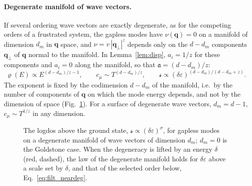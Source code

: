 \documentclass[10pt,a4paper]{article}
\theoremstyle{plain}
\theoremstyle{remark}
\newcommand{\lndos}{{logdos}}  %
\newcommand{\lds}{\mathscr{s}}  %
\begin{document}
\paragraph{Degenerate manifold of wave vectors.} If several ordering wave
vectors are exactly degenerate, as for the competing orders of a frustrated
system, the gapless modes have $\nu(\mathbf q)=0$ on a manifold of dimension
$d_m$ in $\mathbf q$ space, and $\nu=v\,|\mathbf q_\perp|^{z}$ depends only on
the $d-d_m$ components $\mathbf q_\perp$ of $\mathbf q$ normal to the
manifold. In Lemma~\ref{lem:disp}, $a_i=1/z$ for these components and
$a_i=0$ along the manifold, so that $\mathfrak a=(d-d_m)/z$:
\begin{equation}\label{eq:filt_manifold}
  \varrho(E)\propto E^{(d-d_m)/z-1} ,\qquad
  c_\mu\sim T^{(d-d_m)/z} ,\qquad
  \lds\propto(\delta\varepsilon)^{(d-d_m)/(d-d_m+z)} .
\end{equation}
The exponent is fixed by the codimension $d-d_m$ of the manifold, i.e.\ by
the number of components of $\mathbf q$ on which the mode energy depends,
and not by the dimension of space (Fig.~\ref{fig:manifold}). For a surface
of degenerate wave vectors, $d_m=d-1$, $c_\mu\sim T^{1/z}$ in any dimension.

\begin{figure}[htbp]
\centering
{}
\caption{The \lndos{} above the ground state,
$\lds\propto(\delta\varepsilon)^{\sigma}$, for gapless modes on a degenerate
manifold of wave vectors of dimension $d_m$; $d_m=0$ is the Goldstone case.
When the degeneracy is lifted by an energy $\delta$ (red, dashed), the law
of the degenerate manifold holds for $\delta\varepsilon$ above a scale set
by $\delta$, and that of the selected order below,
Eq.~\eqref{eq:filt_neardeg}.}
\label{fig:manifold}
\end{figure}
\end{document}
